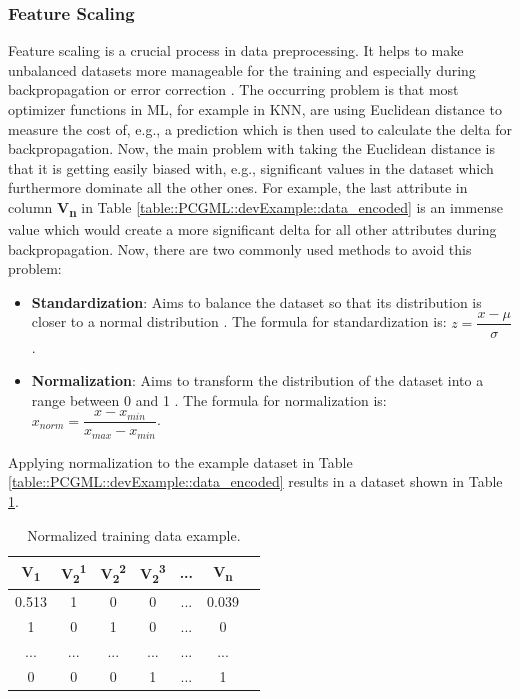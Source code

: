 \documentclass[MGS,Master,english]{twbook}%
\begin{document}
\subsubsection{Feature Scaling}\label{chapter::ml::feature_scaling} %
Feature scaling is a crucial process in data preprocessing. It helps to make unbalanced datasets more manageable for the training and especially during backpropagation or error correction \cite{ml::book::developer}. The occurring problem is that most optimizer functions in \ac{ML}, for example in \ac{KNN}, are using Euclidean distance to measure the cost of, e.g., a prediction which is then used to calculate the delta for backpropagation. Now, the main problem with taking the Euclidean distance is that it is getting easily biased with, e.g., significant values in the dataset which furthermore dominate all the other ones. For example, the last attribute in column \textbf{V\textsubscript{n}} in Table \ref{table::PCGML::devExample::data_encoded} is an immense value which would create a more significant delta for all other attributes during backpropagation. Now, there are two commonly used methods to avoid this problem:
\begin{itemize}
	\item \textbf{Standardization}: Aims to balance the dataset so that its distribution is closer to a normal distribution \cite{ml::book::developer}. The formula for standardization is: $z={\dfrac{x - \mu}{\sigma}}$.
	\item \textbf{Normalization}: Aims to transform the distribution of the dataset into a range between 0 and 1 \cite{ml::book::developer}. The formula for normalization is: $x_{norm}={\dfrac{x - x_{min}}{x_{max}-x_{min}}}$.
\end{itemize}
Applying normalization to the example dataset in Table \ref{table::PCGML::devExample::data_encoded} results in a dataset shown in Table \ref{table::PCGML::devExample::data_normalized}.
\begin{table}[!ht]
	\centering
	\begin{tabular}{|c|c|c|c|c|c|c|}
		\hline
		\textbf{V\textsubscript{1}} & \textbf{V\textsubscript{2}\textsuperscript{1}}& \textbf{V\textsubscript{2}\textsuperscript{2}}& \textbf{V\textsubscript{2}\textsuperscript{3}} & \textbf{...} & \textbf{V\textsubscript{n}} \\ \hline\hline
		0.513      & 1   & 0   & 0       & ...          & 0.039         \\ \hline
		1           & 0   & 1   & 0       & ...          & 0          \\ \hline
		...         & ... & ... & ...     & ...          & ...         \\ \hline
		0      & 0   & 0   & 1       & ...          & 1         \\ \hline
	\end{tabular}
	\caption{Normalized training data example.}
	\label{table::PCGML::devExample::data_normalized}
\end{table}
\end{document}
